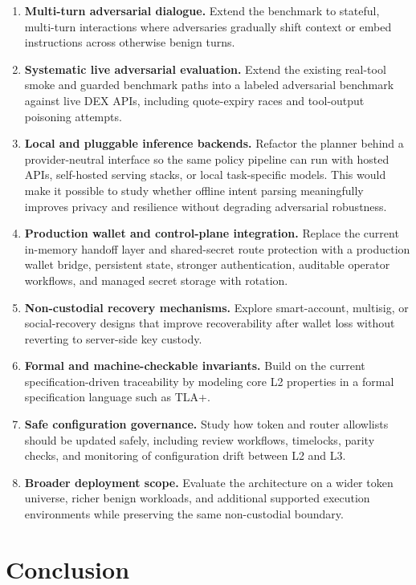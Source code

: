 ﻿\documentclass[conference]{IEEEtran}
\begin{document}
\begin{enumerate}
    \item \textbf{Multi-turn adversarial dialogue.} Extend the benchmark to stateful, multi-turn interactions where adversaries gradually shift context or embed instructions across otherwise benign turns.
    \item \textbf{Systematic live adversarial evaluation.} Extend the existing real-tool smoke and guarded benchmark paths into a labeled adversarial benchmark against live DEX APIs, including quote-expiry races and tool-output poisoning attempts.
    \item \textbf{Local and pluggable inference backends.} Refactor the planner behind a provider-neutral interface so the same policy pipeline can run with hosted APIs, self-hosted serving stacks, or local task-specific models. This would make it possible to study whether offline intent parsing meaningfully improves privacy and resilience without degrading adversarial robustness.
    \item \textbf{Production wallet and control-plane integration.} Replace the current in-memory handoff layer and shared-secret route protection with a production wallet bridge, persistent state, stronger authentication, auditable operator workflows, and managed secret storage with rotation.
    \item \textbf{Non-custodial recovery mechanisms.} Explore smart-account, multisig, or social-recovery designs that improve recoverability after wallet loss without reverting to server-side key custody.
    \item \textbf{Formal and machine-checkable invariants.} Build on the current specification-driven traceability by modeling core L2 properties in a formal specification language such as TLA+.
    \item \textbf{Safe configuration governance.} Study how token and router allowlists should be updated safely, including review workflows, timelocks, parity checks, and monitoring of configuration drift between L2 and L3.
    \item \textbf{Broader deployment scope.} Evaluate the architecture on a wider token universe, richer benign workloads, and additional supported execution environments while preserving the same non-custodial boundary.
\end{enumerate}

\section{Conclusion}
\end{document}
